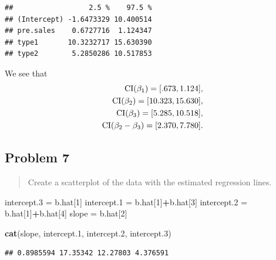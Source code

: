 \documentclass[
]{article}
\newenvironment{Shaded}{\begin{snugshade}}{\end{snugshade}}
\newcommand{\DecValTok}[1]{\textcolor[rgb]{0.00,0.00,0.81}{#1}}
\newcommand{\FloatTok}[1]{\textcolor[rgb]{0.00,0.00,0.81}{#1}}
\newcommand{\FunctionTok}[1]{\textcolor[rgb]{0.13,0.29,0.53}{\textbf{#1}}}
\newcommand{\NormalTok}[1]{#1}
\newcommand{\OtherTok}[1]{\textcolor[rgb]{0.56,0.35,0.01}{#1}}
\newcommand{\SpecialCharTok}[1]{\textcolor[rgb]{0.81,0.36,0.00}{\textbf{#1}}}
\begin{document}
\begin{verbatim}
##                  2.5 %    97.5 %
## (Intercept) -1.6473329 10.400514
## pre.sales    0.6727716  1.124347
## type1       10.3232717 15.630390
## type2        5.2850286 10.517853
\end{verbatim}

We see that \begin{align*}
  \operatorname{CI}(\beta_1) = [.673,1.124],\\
  \operatorname{CI}(\beta_2) = [10.323,15.630],\\
  \operatorname{CI}(\beta_3) = [5.285,10.518],\\
  \operatorname{CI}(\beta_2-\beta_3) = [2.370, 7.780].
\end{align*}

\hypertarget{problem-7}{%
\subsection{Problem 7}\label{problem-7}}

\begin{quote}
Create a scatterplot of the data with the estimated regression lines.
\end{quote}

\begin{Shaded}
\begin{Highlighting}[]
\NormalTok{intercept}\FloatTok{.3} \OtherTok{=}\NormalTok{ b.hat[}\DecValTok{1}\NormalTok{]}
\NormalTok{intercept}\FloatTok{.1} \OtherTok{=}\NormalTok{ b.hat[}\DecValTok{1}\NormalTok{]}\SpecialCharTok{+}\NormalTok{b.hat[}\DecValTok{3}\NormalTok{]}
\NormalTok{intercept}\FloatTok{.2} \OtherTok{=}\NormalTok{ b.hat[}\DecValTok{1}\NormalTok{]}\SpecialCharTok{+}\NormalTok{b.hat[}\DecValTok{4}\NormalTok{]}
\NormalTok{slope }\OtherTok{=}\NormalTok{ b.hat[}\DecValTok{2}\NormalTok{]}

\FunctionTok{cat}\NormalTok{(slope, intercept}\FloatTok{.1}\NormalTok{, intercept}\FloatTok{.2}\NormalTok{, intercept}\FloatTok{.3}\NormalTok{)}
\end{Highlighting}
\end{Shaded}

\begin{verbatim}
## 0.8985594 17.35342 12.27803 4.376591
\end{verbatim}
\end{document}

